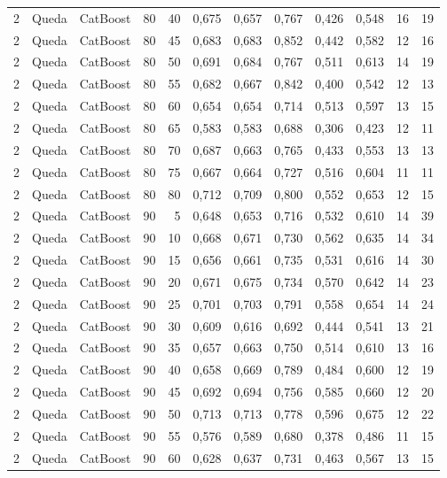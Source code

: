 \begin{longtable}{@{}rllrrrrrrrrr@{}}
2 & Queda & CatBoost & 80 & 40 & 0,675 & 0,657 & 0,767 & 0,426 & 0,548 & 16 & 19 \\
2 & Queda & CatBoost & 80 & 45 & 0,683 & 0,683 & 0,852 & 0,442 & 0,582 & 12 & 16 \\
2 & Queda & CatBoost & 80 & 50 & 0,691 & 0,684 & 0,767 & 0,511 & 0,613 & 14 & 19 \\
2 & Queda & CatBoost & 80 & 55 & 0,682 & 0,667 & 0,842 & 0,400 & 0,542 & 12 & 13 \\
2 & Queda & CatBoost & 80 & 60 & 0,654 & 0,654 & 0,714 & 0,513 & 0,597 & 13 & 15 \\
2 & Queda & CatBoost & 80 & 65 & 0,583 & 0,583 & 0,688 & 0,306 & 0,423 & 12 & 11 \\
2 & Queda & CatBoost & 80 & 70 & 0,687 & 0,663 & 0,765 & 0,433 & 0,553 & 13 & 13 \\
2 & Queda & CatBoost & 80 & 75 & 0,667 & 0,664 & 0,727 & 0,516 & 0,604 & 11 & 11 \\
2 & Queda & CatBoost & 80 & 80 & 0,712 & 0,709 & 0,800 & 0,552 & 0,653 & 12 & 15 \\
2 & Queda & CatBoost & 90 & 5 & 0,648 & 0,653 & 0,716 & 0,532 & 0,610 & 14 & 39 \\
2 & Queda & CatBoost & 90 & 10 & 0,668 & 0,671 & 0,730 & 0,562 & 0,635 & 14 & 34 \\
2 & Queda & CatBoost & 90 & 15 & 0,656 & 0,661 & 0,735 & 0,531 & 0,616 & 14 & 30 \\
2 & Queda & CatBoost & 90 & 20 & 0,671 & 0,675 & 0,734 & 0,570 & 0,642 & 14 & 23 \\
2 & Queda & CatBoost & 90 & 25 & 0,701 & 0,703 & 0,791 & 0,558 & 0,654 & 14 & 24 \\
2 & Queda & CatBoost & 90 & 30 & 0,609 & 0,616 & 0,692 & 0,444 & 0,541 & 13 & 21 \\
2 & Queda & CatBoost & 90 & 35 & 0,657 & 0,663 & 0,750 & 0,514 & 0,610 & 13 & 16 \\
2 & Queda & CatBoost & 90 & 40 & 0,658 & 0,669 & 0,789 & 0,484 & 0,600 & 12 & 19 \\
2 & Queda & CatBoost & 90 & 45 & 0,692 & 0,694 & 0,756 & 0,585 & 0,660 & 12 & 20 \\
2 & Queda & CatBoost & 90 & 50 & 0,713 & 0,713 & 0,778 & 0,596 & 0,675 & 12 & 22 \\
2 & Queda & CatBoost & 90 & 55 & 0,576 & 0,589 & 0,680 & 0,378 & 0,486 & 11 & 15 \\
2 & Queda & CatBoost & 90 & 60 & 0,628 & 0,637 & 0,731 & 0,463 & 0,567 & 13 & 15 \\

\end{longtable}
